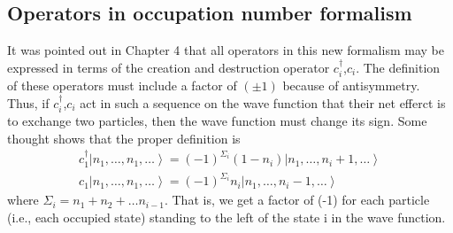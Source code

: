 \subsection{Operators in occupation number formalism}
It was pointed out in Chapter 4 that all operators in this new formalism may be expressed in terms of the creation and destruction operator $c_i^{\dagger}$,$c_i$. The definition of these operators must include a factor of $(\pm1)$ because of antisymmetry. Thus, if $c_i^{\dagger}$,$c_i$ act in such a sequence on the wave function that their net efferct is to exchange two particles, then the wave function must change its sign. Some thought shows that the proper definition is 
\begin{equation}\begin{array}{l}
c_{1}^{\dagger}\left|n_{1}, \ldots, n_{1}, \ldots\right\rangle=(-1)^{\Sigma_{i}}\left(1-n_{i}\right)\left|n_{1}, \ldots, n_{i}+1, \ldots\right\rangle \\
c_{1}\left|n_{1}, \ldots, n_{1}, \ldots\right\rangle=(-1)^{\Sigma_{i}} n_{i}\left|n_{1}, \ldots, n_{i}-1, \ldots\right\rangle
\end{array}\end{equation}
where $\Sigma_i=n_1+n_2+\ldots n_{i-1}$. That is, we get a factor of (-1) for each particle (i.e., each occupied state) standing to the left of the state i in the wave function.

